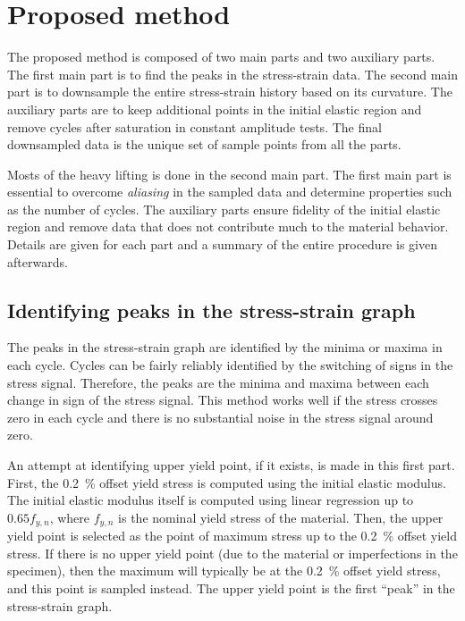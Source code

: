 \documentclass[a4paper,11pt]{article}
\begin{document}
\section{Proposed method}

The proposed method is composed of two main parts and two auxiliary parts.
The first main part is to find the peaks in the stress-strain data.
The second main part is to downsample the entire stress-strain history based on its curvature.
The auxiliary parts are to keep additional points in the initial elastic region and remove cycles after saturation in constant amplitude tests.
The final downsampled data is the unique set of sample points from all the parts.

Mosts of the heavy lifting is done in the second main part.
The first main part is essential to overcome \emph{aliasing} in the sampled data and determine properties such as the number of cycles.
The auxiliary parts ensure fidelity of the initial elastic region and remove data that does not contribute much to the material behavior.
Details are given for each part and a summary of the entire procedure is given afterwards.

\subsection{Identifying peaks in the stress-strain graph}

The peaks in the stress-strain graph are identified by the minima or maxima in each cycle.
Cycles can be fairly reliably identified by the switching of signs in the stress signal.
Therefore, the peaks are the minima and maxima between each change in sign of the stress signal.
This method works well if the stress crosses zero in each cycle and there is no substantial noise in the stress signal around zero.

An attempt at identifying upper yield point, if it exists, is made in this first part.
First, the 0.2~\% offset yield stress is computed using the initial elastic modulus.
The initial elastic modulus itself is computed using linear regression up to $0.65 f_{y,n}$, where $f_{y,n}$ is the nominal yield stress of the material.
Then, the upper yield point is selected as the point of maximum stress up to the 0.2~\% offset yield stress.
If there is no upper yield point (due to the material or imperfections in the specimen), then the maximum will typically be at the 0.2~\% offset yield stress, and this point is sampled instead.
The upper yield point is the first ``peak'' in the stress-strain graph.
\end{document}
